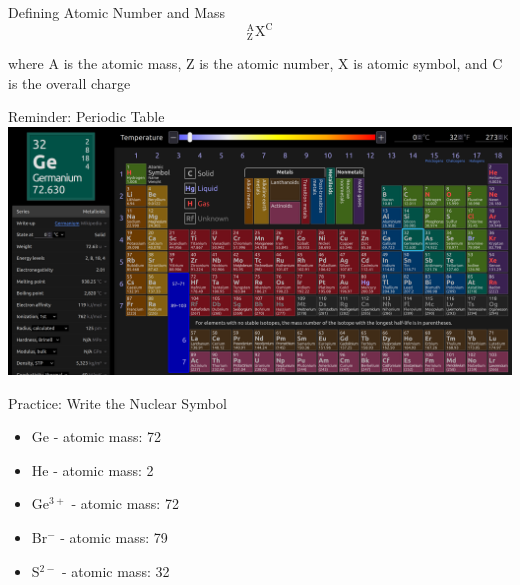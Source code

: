 \documentclass[11pt]{beamer}
\begin{document}
\begin{frame}{Defining Atomic Number and Mass}
  \begin{equation}
    ^\text{A}_\text{Z}\text{X}^\text{C}
  \end{equation}

  where A is the atomic mass, Z is the atomic number, X is atomic
  symbol, and C is the overall charge
\end{frame}

\begin{frame}{Reminder: Periodic Table}
  \centering
  \includegraphics[scale=0.3]{ptable}
\end{frame}

\begin{frame}{Practice: Write the Nuclear Symbol}
  \begin{itemize}
  \item Ge - atomic mass: 72
  \item He - atomic mass: 2
  \item Ge$^{3+}$ - atomic mass: 72
  \item Br$^{-}$ - atomic mass: 79
  \item S$^{2-}$ - atomic mass: 32
  \end{itemize}
\end{frame}
\end{document}
